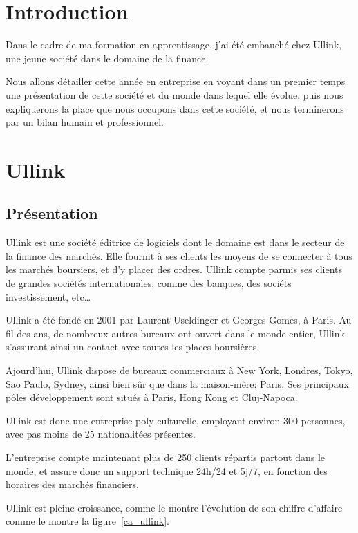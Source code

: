 \documentclass[a4paper, 12pt]{article}
\begin{document}

\pagebreak


\section*{Introduction}

Dans le cadre de ma formation en apprentissage, j'ai été embauché chez Ullink, une jeune société dans le domaine de la finance.

Nous allons détailler cette année en entreprise en voyant dans un premier temps une présentation de cette société et du monde dans lequel elle évolue, puis nous expliquerons la place que nous occupons dans cette société, et nous terminerons par un bilan humain et professionnel.
\pagebreak

\tableofcontents
\pagebreak

\section{Ullink}
\subsection{Présentation}
Ullink est une société éditrice de logiciels dont le domaine est dans le secteur de la finance des marchés. Elle fournit à ses clients les moyens de se connecter à tous les marchés boursiers, et d'y placer des ordres. Ullink compte parmis ses clients de grandes sociétés internationales, comme des banques, des sociéts investissement, etc\dots

Ullink a été fondé en 2001 par Laurent Useldinger et Georges Gomes, à Paris. Au fil des ans, de nombreux autres bureaux ont ouvert dans le monde entier, Ullink s'assurant ainsi un contact avec toutes les places boursières.

Ajourd'hui, Ullink dispose de bureaux commerciaux à New York, Londres, Tokyo, Sao Paulo, Sydney, ainsi bien sûr que dans la maison-mère: Paris. Ses principaux pôles développement sont situés à Paris, Hong Kong et Cluj-Napoca.

Ullink est donc une entreprise poly culturelle, employant environ 300 personnes, avec pas moins de 25 nationalitées présentes.

L'entreprise compte maintenant plus de 250 clients répartis partout dans le monde, et assure donc un support technique 24h/24 et 5j/7, en fonction des horaires des marchés financiers.

Ullink est pleine croissance, comme le montre l'évolution de son chiffre d'affaire comme le montre la figure~\ref{ca_ullink}.
\end{document}
